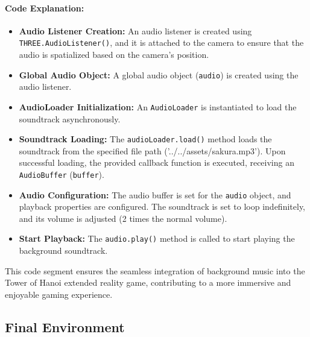 \documentclass{article}
\begin{document}
\paragraph{Code Explanation:}

\begin{itemize}
    \item \textbf{Audio Listener Creation:} An audio listener is created using \texttt{THREE.AudioListener()}, and it is attached to the camera to ensure that the audio is spatialized based on the camera's position.

    \item \textbf{Global Audio Object:} A global audio object (\texttt{audio}) is created using the audio listener.

    \item \textbf{AudioLoader Initialization:} An \texttt{AudioLoader} is instantiated to load the soundtrack asynchronously.

    \item \textbf{Soundtrack Loading:} The \texttt{audioLoader.load()} method loads the soundtrack from the specified file path ('../../assets/sakura.mp3'). Upon successful loading, the provided callback function is executed, receiving an \texttt{AudioBuffer} (\texttt{buffer}).

    \item \textbf{Audio Configuration:} The audio buffer is set for the \texttt{audio} object, and playback properties are configured. The soundtrack is set to loop indefinitely, and its volume is adjusted (2 times the normal volume).

    \item \textbf{Start Playback:} The \texttt{audio.play()} method is called to start playing the background soundtrack.

\end{itemize}

This code segment ensures the seamless integration of background music into the Tower of Hanoi extended reality game, contributing to a more immersive and enjoyable gaming experience.

\newpage
\subsection{Final Environment}
\end{document}
